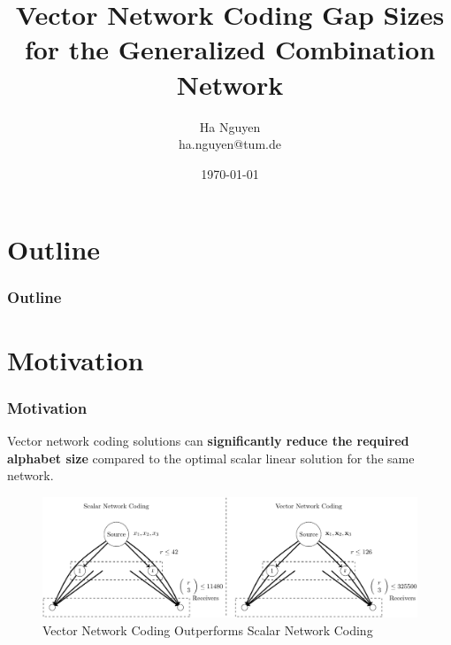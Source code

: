 \documentclass[c]{beamer}
\title[Vector Network Coding Gap Sizes for the Generalized Combination Network]{Vector Network Coding Gap Sizes for the Generalized Combination Network}
\author[Ha Nguyen]{Ha Nguyen\\ {\footnotesize \hspace{1mm} ha.nguyen@tum.de} }
\date{\today}
\begin{document}
\begin{frame}
	\titlepage
\end{frame}

\section*{Outline}
\begin{frame}
	\frametitle{Outline}
	\tableofcontents
\end{frame}


\section{Motivation}
\begin{frame}[c]
\frametitle{Motivation}

	Vector network coding solutions can \textbf{significantly reduce the required alphabet size} compared to the optimal scalar linear solution for the same network. %
	\begin{figure}
	\centering{}\includegraphics[width=0.6\paperwidth]{../figures/slide_scalar_vector_nc}
	\caption{Vector Network Coding Outperforms Scalar Network Coding}
	\end{figure}	

\end{frame}
\end{document}
